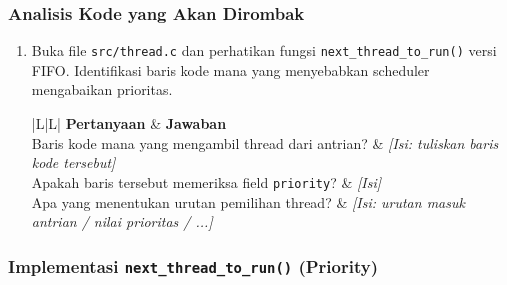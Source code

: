 \subsubsection{Analisis Kode yang Akan Dirombak}

\begin{enumerate}

	\item Buka file \texttt{src/thread.c} dan perhatikan fungsi \texttt{next\_thread\_to\_run()} versi FIFO. Identifikasi baris kode mana yang menyebabkan scheduler mengabaikan prioritas.

	      \begin{table}[htbp]
		      \centering
		      \caption{Identifikasi kelemahan kode Round-Robin}
		      \begin{tabulary}{\textwidth}{|L|L|}
			      \hline
			      \textbf{Pertanyaan} & \textbf{Jawaban} \\ \hline
			      Baris kode mana yang mengambil thread dari antrian?
			      & \textit{[Isi: tuliskan baris kode tersebut]} \\ \hline
			      Apakah baris tersebut memeriksa field \texttt{priority}?
			      & \textit{[Isi]} \\ \hline
			      Apa yang menentukan urutan pemilihan thread?
			      & \textit{[Isi: urutan masuk antrian / nilai prioritas / ...]} \\ \hline
		      \end{tabulary}
	      \end{table}

\end{enumerate}

\subsubsection{Implementasi \texttt{next\_thread\_to\_run()} (Priority)}

